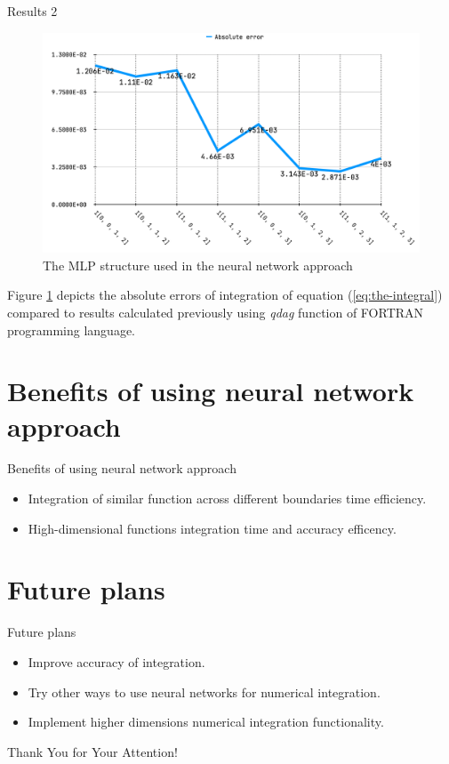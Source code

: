 \documentclass[9pt]{beamer}
\begin{document}
\begin{frame}{Results 2}

\begin{figure}[h!]
    \centering
    \includegraphics[width=0.7\linewidth]{iaes.png}
    \caption{The MLP structure used in the neural network approach}
    \label{fig:iaes}
\end{figure}

Figure \ref{fig:iaes} depicts the absolute errors of integration of equation (\ref{eq:the-integral}) compared to results calculated previously using \textit{qdag} function of FORTRAN programming language.
    
\end{frame}

\section{Benefits of using neural network approach}

\begin{frame}{Benefits of using neural network approach}

\begin{itemize}
    \item Integration of similar function across different boundaries time efficiency.
    \item High-dimensional functions integration time and accuracy efficency.
\end{itemize}
    
\end{frame}

\section{Future plans}

\begin{frame}{Future plans}

\begin{itemize}
    \item Improve accuracy of integration.
    \item Try other ways to use neural networks for numerical integration.
    \item Implement higher dimensions numerical integration functionality.
\end{itemize}
    
\end{frame}

\begin{frame}
  \centering
  \vspace{1cm}
  \Large Thank You for Your Attention!
\end{frame}
\end{document}
